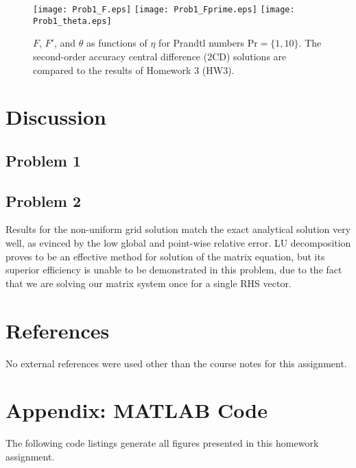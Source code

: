 \documentclass[11pt]{article}
\begin{document}
\begin{figure}[h!]
\begin{center}
\texttt{[image: Prob1\_F.eps]}
\texttt{[image: Prob1\_Fprime.eps]}
\texttt{[image: Prob1\_theta.eps]}
\\[-0.5cm]
\caption{$F$, $F'$, and $\theta$ as functions of $\eta$ for Prandtl numbers $\text{Pr} = \{1, 10\}$. The second-order accuracy central difference (2CD) solutions are compared to the results of Homework 3 (HW3).}
\label{fig:Prob1}
\end{center}
\end{figure}

\section{Discussion} %

\subsection{Problem 1}

\subsection{Problem 2}

Results for the non-uniform grid solution match the exact analytical solution very well, as evinced by the low global and point-wise relative error. LU decomposition proves to be an effective method for solution of the matrix equation, but its superior efficiency is unable to be demonstrated in this problem, due to the fact that we are solving our matrix system once for a single RHS vector.

\section{References} %

No external references were used other than the course notes for this assignment.

\section*{Appendix: MATLAB Code} %

The following code listings generate all figures presented in this homework assignment.


\end{document}
